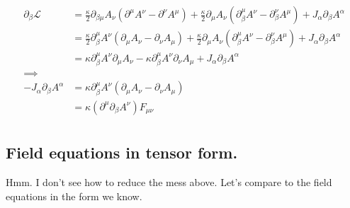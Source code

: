 \documentclass{article}
\newcommand{\LL}[0]{\mathcal{L}}
\begin{document}
\begin{align*}
\partial_{\beta} \LL 
&= 
\frac{\kappa}{2}
\partial_{\beta\mu} A_{\nu} ( \partial^{\mu} A^{\nu} - \partial^{\nu} A^{\mu} )
+ \frac{\kappa}{2}
\partial_{\mu} A_{\nu} ( \partial_{\beta}^{\mu} A^{\nu} - \partial_{\beta}^{\nu} A^{\mu} )
+ J_{\alpha} \partial_{\beta}A^{\alpha} \\
&= 
\frac{\kappa}{2} \partial_{\beta}^{\mu} A^{\nu} ( \partial_{\mu} A_{\nu} - \partial_{\nu} A_{\mu} )
+ \frac{\kappa}{2} \partial_{\mu} A_{\nu} ( \partial_{\beta}^{\mu} A^{\nu} - \partial_{\beta}^{\nu} A^{\mu} )
+ J_{\alpha} \partial_{\beta}A^{\alpha} \\
&= 
{\kappa} \partial_{\beta}^{\mu} A^{\nu} \partial_{\mu} A_{\nu}
- {\kappa} \partial_{\beta}^{\mu} A^{\nu} \partial_{\nu} A_{\mu}
+ J_{\alpha} \partial_{\beta}A^{\alpha} \\
\implies \\
-J_{\alpha} \partial_{\beta}A^{\alpha} 
&= {\kappa} \partial_{\beta}^{\mu} A^{\nu} \left( \partial_{\mu} A_{\nu} - \partial_{\nu} A_{\mu} \right) \\
&= {\kappa} (\partial^{\mu} \partial_{\beta}A^{\nu} ) F_{\mu\nu} \\
\end{align*}

\subsection{ Field equations in tensor form. }

Hmm.  I don't see how to reduce the mess above.  Let's compare to the field equations in the form we know.
\end{document}
